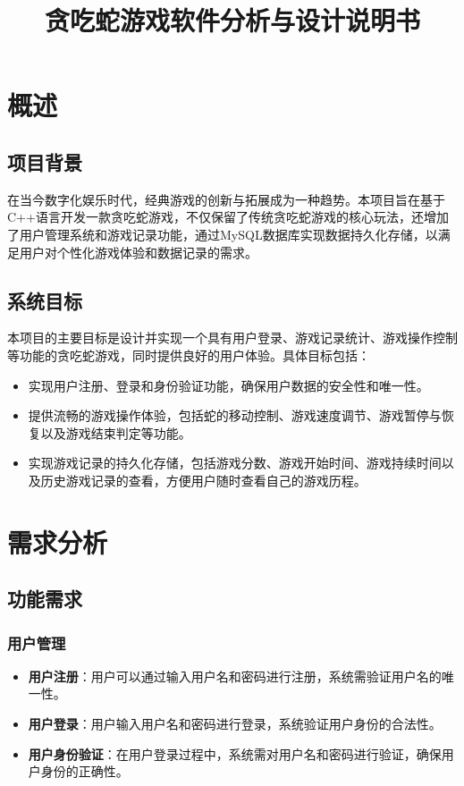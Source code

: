 \documentclass{article}
\begin{document}
\title{贪吃蛇游戏软件分析与设计说明书}
\author{} %
\date{} %
\maketitle

\section{概述}

\subsection{项目背景}
在当今数字化娱乐时代，经典游戏的创新与拓展成为一种趋势。本项目旨在基于C++语言开发一款贪吃蛇游戏，不仅保留了传统贪吃蛇游戏的核心玩法，还增加了用户管理系统和游戏记录功能，通过MySQL数据库实现数据持久化存储，以满足用户对个性化游戏体验和数据记录的需求。

\subsection{系统目标}
本项目的主要目标是设计并实现一个具有用户登录、游戏记录统计、游戏操作控制等功能的贪吃蛇游戏，同时提供良好的用户体验。具体目标包括：
\begin{itemize}
    \item 实现用户注册、登录和身份验证功能，确保用户数据的安全性和唯一性。
    \item 提供流畅的游戏操作体验，包括蛇的移动控制、游戏速度调节、游戏暂停与恢复以及游戏结束判定等功能。
    \item 实现游戏记录的持久化存储，包括游戏分数、游戏开始时间、游戏持续时间以及历史游戏记录的查看，方便用户随时查看自己的游戏历程。
\end{itemize}

\section{需求分析}

\subsection{功能需求}
\subsubsection{用户管理}
\begin{itemize}
    \item \textbf{用户注册}：用户可以通过输入用户名和密码进行注册，系统需验证用户名的唯一性。
    \item \textbf{用户登录}：用户输入用户名和密码进行登录，系统验证用户身份的合法性。
    \item \textbf{用户身份验证}：在用户登录过程中，系统需对用户名和密码进行验证，确保用户身份的正确性。
\end{itemize}
\end{document}

